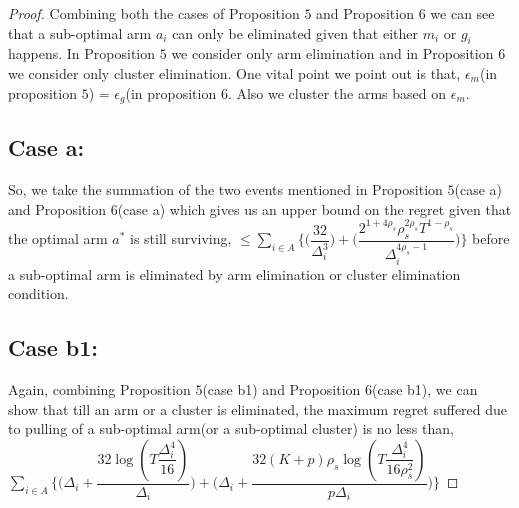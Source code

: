 \begin{proof}
Combining both the cases of Proposition $5$ and Proposition $6$ we can see that a sub-optimal arm $a_{i}$ can only be eliminated given that either $m_{i}$ or $g_{i}$ happens. In Proposition $5$ we consider only arm elimination and in Proposition $6$ we consider only cluster elimination. One vital point we point out is that, $\epsilon_{m}$(in proposition $5$) = $\epsilon_{g}$(in proposition $6$. Also we cluster the arms based on $\epsilon_{m}$.
\subsection{Case a:} 
So, we take the summation of the two events mentioned in Proposition $5$(case a) and Proposition $6$(case a)
which gives us an upper bound on the regret given that the optimal arm $a^{*}$ is still surviving, 
\newline
$\leq \sum_{i\in A}\bigg\lbrace\bigg(\dfrac{32}{\Delta_{i}^{3}}\bigg) + \bigg(\dfrac{2^{1+4\rho_{s}}\rho_{s}^{2\rho_{s}}T^{1-\rho_{s}}}{\Delta_{i}^{4\rho_{s}-1}}\bigg)\bigg\rbrace$ 
\newline
before a sub-optimal arm is eliminated by arm elimination or cluster elimination condition.
\subsection{Case b1:} 
Again, combining Proposition $5$(case b1) and Proposition $6$(case b1), we can show that till an arm or a cluster is eliminated, the maximum regret suffered due to pulling of a sub-optimal arm(or a sub-optimal cluster) is no less than,
\newline
$\sum_{i\in A}\bigg\lbrace\bigg(\Delta_{i}+\dfrac{32\log{(T\dfrac{\Delta_{i}^{4}}{16})}}{\Delta_{i}}\bigg) + \bigg(\Delta_{i}+\dfrac{32(K+p)\rho_{s}\log{(T\dfrac{\Delta_{i}^{4}}{16\rho_{s}^{2}})}}{p\Delta_{i}}\bigg)\bigg\rbrace $
\newline

\end{proof}
